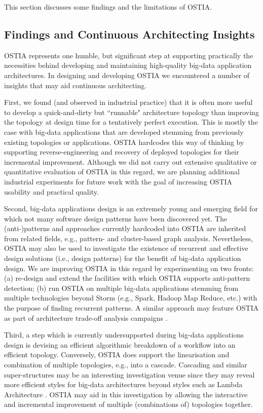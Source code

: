 This section discusses some findings and the limitations of OSTIA.

\subsection{Findings and Continuous Architecting Insights}

OSTIA represents one humble, but significant step at supporting practically the necessities behind developing and maintaining high-quality big-data application architectures. In designing and developing OSTIA we encountered a number of insights that may aid continuous architecting.

First, we found (and observed in industrial practice) that it is often more useful to develop a quick-and-dirty but ``runnable" architecture topology than improving the topology at design time for a tentatively perfect execution. This is mostly the case with big-data applications that are developed stemming from previously existing topologies or applications. OSTIA hardcodes this way of thinking by supporting reverse-engineering and recovery of deployed topologies for their incremental improvement. Although we did not carry out extensive qualitative or quantitative evaluation of OSTIA in this regard, we are planning additional industrial experiments for future work with the goal of increasing OSTIA usability and practical quality.

Second, big-data applications design is an extremely young and emerging field for which not many software design patterns have been discovered yet. The (anti-)patterns and approaches currently hardcoded into OSTIA are inherited from related fields, e.g., pattern- and cluster-based graph analysis. Nevertheless, OSTIA may also be used to investigate the existence of recurrent and effective design solutions (i.e., design patterns) for the benefit of big-data application design. We are improving OSTIA in this regard by experimenting on two fronts: (a) re-design and extend the facilities with which OSTIA supports anti-pattern detection; (b) run OSTIA on multiple big-data applications stemming from multiple technologies beyond Storm (e.g., Spark, Hadoop Map Reduce, etc.) with the purpose of finding recurrent patterns. A similar approach may feature OSTIA as part of architecture trade-off analysis campaigns \cite{atam}.

Third, a step which is currently undersupported during big-data applications design is devising an efficient algorithmic breakdown of a workflow into an efficient topology. Conversely, OSTIA does support the linearisation and combination of multiple topologies, e.g., into a cascade. Cascading and similar super-structures may be an interesting investigation venue since they may reveal more efficient styles for big-data architectures beyond styles such as Lambda Architecture \cite{lambda}. OSTIA may aid in this investigation by allowing the interactive and incremental improvement of multiple (combinations of) topologies together.

